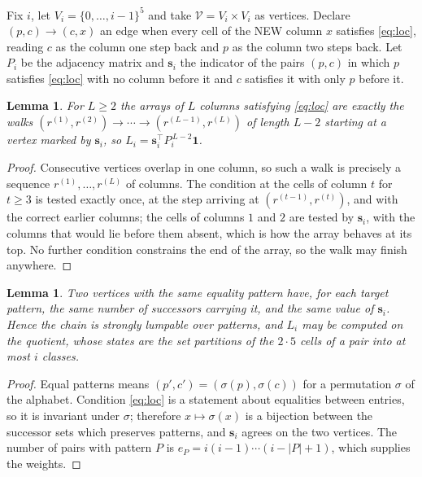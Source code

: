 \documentclass[11pt,a4paper]{article}
\theoremstyle{plain}
\newtheorem{lemma}[theorem]{Lemma}
\theoremstyle{definition}
\begin{document}
Fix $i$, let $V_i=\{0,\dots,i-1\}^{5}$ and take $\mathcal V=V_i\times V_i$ as vertices.
Declare $(p,c)\to(c,x)$ an edge when every cell of the NEW column $x$ satisfies
\eqref{eq:loc}, reading $c$ as the column one step back and $p$ as the column two steps
back. Let $P_i$ be the adjacency matrix and $\mathbf{s}_i$ the indicator of the pairs
$(p,c)$ in which $p$ satisfies \eqref{eq:loc} with no column before it and $c$ satisfies it
with only $p$ before it.

\begin{lemma}\label{lem:walk}
For $L\ge2$ the arrays of $L$ columns satisfying \eqref{eq:loc} are exactly the walks
$(r^{(1)},r^{(2)})\to\cdots\to(r^{(L-1)},r^{(L)})$ of length $L-2$ starting at a
vertex marked by $\mathbf{s}_i$, so
$L_i=\mathbf{s}_i^{\!\top}P_i^{\,L-2}\mathbf{1}$.
\end{lemma}

\begin{proof}
Consecutive vertices overlap in one column, so such a walk is precisely a sequence
$r^{(1)},\dots,r^{(L)}$ of columns. The condition at the cells of column $t$ for $t\ge3$
is tested exactly once, at the step arriving at $(r^{(t-1)},r^{(t)})$, and with the
correct earlier columns; the cells of columns $1$ and $2$ are tested by $\mathbf{s}_i$, with
the columns that would lie before them absent, which is how the array behaves at its top. No
further condition constrains the end of the array, so the walk may finish anywhere.
\end{proof}

\begin{lemma}\label{lem:lump}
Two vertices with the same equality pattern have, for each target pattern, the same number of
successors carrying it, and the same value of $\mathbf{s}_i$. Hence the chain is strongly
lumpable over patterns, and $L_i$ may be computed on the quotient, whose states are the set
partitions of the $2\cdot5$ cells of a pair into at most $i$ classes.
\end{lemma}

\begin{proof}
Equal patterns means $(p',c')=(\sigma(p),\sigma(c))$ for a permutation $\sigma$ of the
alphabet. Condition \eqref{eq:loc} is a statement about equalities between entries, so it is
invariant under $\sigma$; therefore $x\mapsto\sigma(x)$ is a bijection between the successor
sets which preserves patterns, and $\mathbf{s}_i$ agrees on the two vertices. The number of
pairs with pattern $P$ is $e_P=i(i-1)\cdots(i-|P|+1)$, which supplies the weights.
\end{proof}
\end{document}
